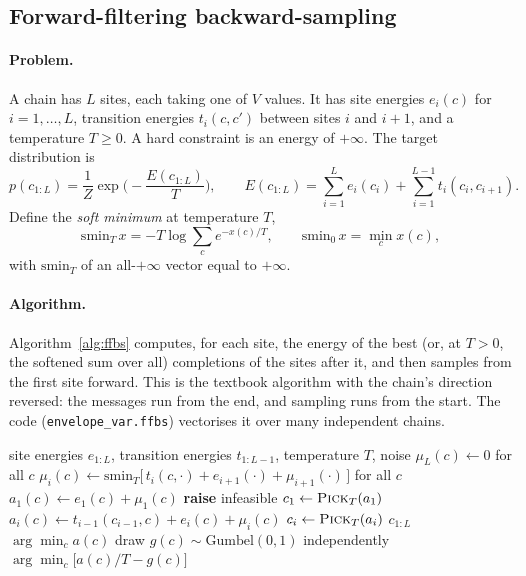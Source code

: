 \documentclass[11pt]{article}
\newcommand{\1}{\mathds{1}}
\begin{document}
\subsection{Forward-filtering backward-sampling}
\label{sec:ffbs}

\paragraph{Problem.} A chain has $L$ sites, each taking one of $V$ values. It has site energies
$e_i(c)$ for $i = 1,\dots,L$, transition energies $t_i(c, c')$ between sites $i$ and $i+1$, and
a temperature $T \ge 0$. A hard constraint is an energy of $+\infty$. The target distribution
is
\[
  p(c_{1:L}) = \frac{1}{Z}\exp\!\Big(-\frac{E(c_{1:L})}{T}\Big), \qquad
  E(c_{1:L}) = \sum_{i=1}^{L} e_i(c_i) + \sum_{i=1}^{L-1} t_i(c_i, c_{i+1}).
\]
Define the \emph{soft minimum} at temperature $T$,
\[
  \mathrm{smin}_T\, x = -T \log \textstyle\sum_{c} e^{-x(c)/T}, \qquad \mathrm{smin}_0\, x = \min_c x(c),
\]
with $\mathrm{smin}_T$ of an all-$+\infty$ vector equal to $+\infty$.

\paragraph{Algorithm.} Algorithm~\ref{alg:ffbs} computes, for each site, the energy of the best
(or, at $T > 0$, the softened sum over all) completions of the sites after it, and then samples
from the first site forward. This is the textbook algorithm with the chain's direction
reversed: the messages run from the end, and sampling runs from the start. The code
(\texttt{envelope\_var.ffbs}) vectorises it over many independent chains.

\begin{algorithm}[ht]
\caption{Forward-filtering backward-sampling on a chain (messages from the end, samples from the start).}
\label{alg:ffbs}
\begin{algorithmic}[1]
\Require site energies $e_{1:L}$, transition energies $t_{1:L-1}$, temperature $T$, noise
\State $\mu_L(c) \gets 0$ for all $c$ 
  \State $\mu_i(c) \gets \mathrm{smin}_T\big[\, t_i(c, \cdot) + e_{i+1}(\cdot) + \mu_{i+1}(\cdot) \,\big]$ for all $c$
\EndFor
\State $a_1(c) \gets e_1(c) + \mu_1(c)$
 \State \textbf{raise} infeasible \EndIf
\State $c_1 \gets \textsc{Pick}_T(a_1)$
  \State $a_i(c) \gets t_{i-1}(c_{i-1}, c) + e_i(c) + \mu_i(c)$
  \State $c_i \gets \textsc{Pick}_T(a_i)$
\EndFor
\State \Return $c_{1:L}$
\Statex
{}
   \State \Return $\arg\min_c a(c)$ 
  \Else \State draw $g(c) \sim \mathrm{Gumbel}(0,1)$ independently
        \State \Return $\arg\min_c \big[a(c)/T - g(c)\big]$ 
  \EndIf
\EndFunction
\end{algorithmic}
\end{algorithm}
\end{document}

